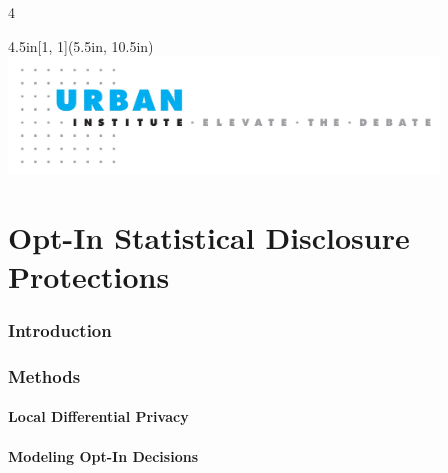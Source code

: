 \documentclass[
]{urban-formatting}
\begin{document}
\begin{titlepage}
\begin{multicols}{4}
      
    \end{multicols}
    
    \vspace{-0.75cm}
    

    \begin{textblock*}{4.5in}[1, 1](5.5in, 10.5in)
        \noindent\includegraphics[width=4.5in]{images/cover-footer.jpg}
    \end{textblock*}
\end{titlepage}



\cleardoublepage

\setcounter{page}{3}
\begin{singlespace}
    \tableofcontents
\end{singlespace}

\thispagestyle{empty}





\part{Opt-In Statistical Disclosure Protections}

\section{Introduction}

\section{Methods}

\subsection{Local Differential Privacy}

\subsection{Modeling Opt-In Decisions}
\end{document}
